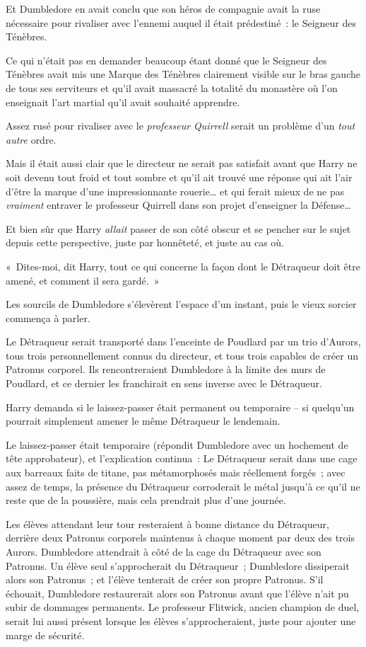 Et Dumbledore en avait conclu que son héros de compagnie avait la ruse nécessaire pour rivaliser avec l'ennemi auquel il était prédestiné~: le Seigneur des Ténèbres.

Ce qui n'était pas en demander beaucoup étant donné que le Seigneur des Ténèbres avait mis une Marque des Ténèbres clairement visible sur le bras gauche de tous ses serviteurs et qu'il avait massacré la totalité du monastère où l'on enseignait l'art martial qu'il avait souhaité apprendre.

Assez rusé pour rivaliser avec le \emph{professeur Quirrell} serait un problème d'un \emph{tout} \emph{autre} ordre.

Mais il était aussi clair que le directeur ne serait pas satisfait avant que Harry ne soit devenu tout froid et tout sombre et qu'il ait trouvé une réponse qui ait l'air d'être la marque d'une impressionnante rouerie… et qui ferait mieux de ne pas \emph{vraiment} entraver le professeur Quirrell dans son projet d'enseigner la Défense…

Et bien sûr que Harry \emph{allait} passer de son côté obscur et se pencher sur le sujet depuis cette perspective, juste par honnêteté, et juste au cas où.

«~Dites-moi, dit Harry, tout ce qui concerne la façon dont le Détraqueur doit être amené, et comment il sera gardé.~»

Les sourcils de Dumbledore s'élevèrent l'espace d'un instant, puis le vieux sorcier commença à parler.

Le Détraqueur serait transporté dans l'enceinte de Poudlard par un trio d'Aurors, tous trois personnellement connus du directeur, et tous trois capables de créer un Patronus corporel. Ils rencontreraient Dumbledore à la limite des murs de Poudlard, et ce dernier les franchirait en sens inverse avec le Détraqueur.

Harry demanda si le laissez-passer était permanent ou temporaire -- si quelqu'un pourrait simplement amener le même Détraqueur le lendemain.

Le laissez-passer était temporaire (répondit Dumbledore avec un hochement de tête approbateur), et l'explication continua~: Le Détraqueur serait dans une cage aux barreaux faits de titane, pas métamorphosés mais réellement forgés~; avec assez de temps, la présence du Détraqueur corroderait le métal jusqu'à ce qu'il ne reste que de la poussière, mais cela prendrait plus d'une journée.

Les élèves attendant leur tour resteraient à bonne distance du Détraqueur, derrière deux Patronus corporels maintenus à chaque moment par deux des trois Aurors. Dumbledore attendrait à côté de la cage du Détraqueur avec son Patronus. Un élève seul s'approcherait du Détraqueur~; Dumbledore dissiperait alors son Patronus~; et l'élève tenterait de créer son propre Patronus. S'il échouait, Dumbledore restaurerait alors son Patronus avant que l'élève n'ait pu subir de dommages permanents. Le professeur Flitwick, ancien champion de duel, serait lui aussi présent lorsque les élèves s'approcheraient, juste pour ajouter une marge de sécurité.

